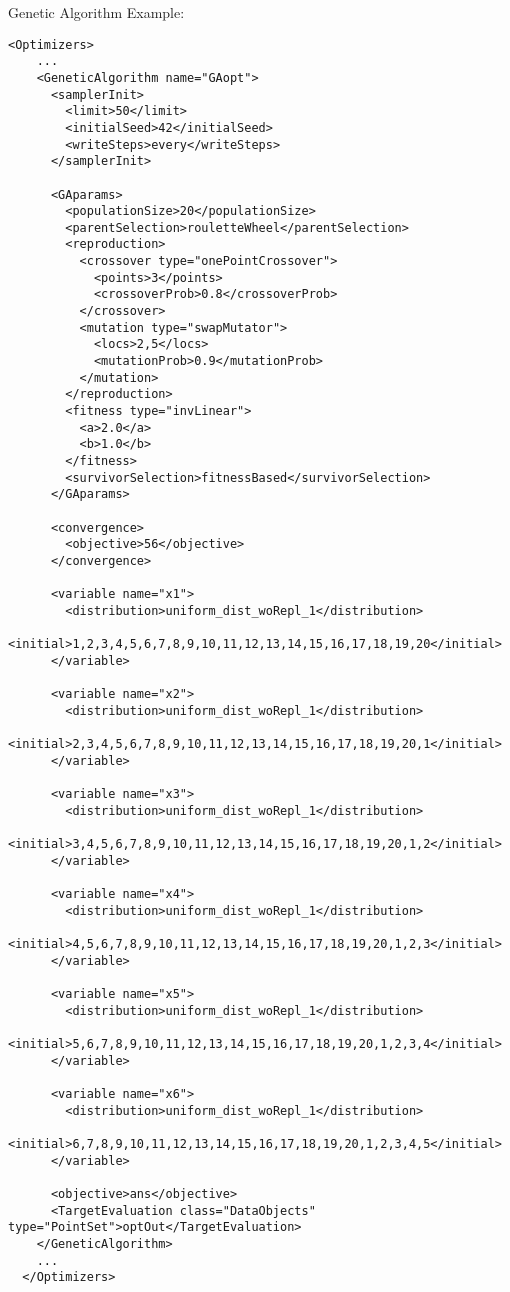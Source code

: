 \hspace{24pt}
Genetic Algorithm Example:
\begin{lstlisting}[style=XML]
  <Optimizers>
    ...
    <GeneticAlgorithm name="GAopt">
      <samplerInit>
        <limit>50</limit>
        <initialSeed>42</initialSeed>
        <writeSteps>every</writeSteps>
      </samplerInit>

      <GAparams>
        <populationSize>20</populationSize>
        <parentSelection>rouletteWheel</parentSelection>
        <reproduction>
          <crossover type="onePointCrossover">
            <points>3</points>
            <crossoverProb>0.8</crossoverProb>
          </crossover>
          <mutation type="swapMutator">
            <locs>2,5</locs>
            <mutationProb>0.9</mutationProb>
          </mutation>
        </reproduction>
        <fitness type="invLinear">
          <a>2.0</a>
          <b>1.0</b>
        </fitness>
        <survivorSelection>fitnessBased</survivorSelection>
      </GAparams>

      <convergence>
        <objective>56</objective>
      </convergence>

      <variable name="x1">
        <distribution>uniform_dist_woRepl_1</distribution>
        <initial>1,2,3,4,5,6,7,8,9,10,11,12,13,14,15,16,17,18,19,20</initial>
      </variable>

      <variable name="x2">
        <distribution>uniform_dist_woRepl_1</distribution>
        <initial>2,3,4,5,6,7,8,9,10,11,12,13,14,15,16,17,18,19,20,1</initial>
      </variable>

      <variable name="x3">
        <distribution>uniform_dist_woRepl_1</distribution>
        <initial>3,4,5,6,7,8,9,10,11,12,13,14,15,16,17,18,19,20,1,2</initial>
      </variable>

      <variable name="x4">
        <distribution>uniform_dist_woRepl_1</distribution>
        <initial>4,5,6,7,8,9,10,11,12,13,14,15,16,17,18,19,20,1,2,3</initial>
      </variable>

      <variable name="x5">
        <distribution>uniform_dist_woRepl_1</distribution>
        <initial>5,6,7,8,9,10,11,12,13,14,15,16,17,18,19,20,1,2,3,4</initial>
      </variable>

      <variable name="x6">
        <distribution>uniform_dist_woRepl_1</distribution>
        <initial>6,7,8,9,10,11,12,13,14,15,16,17,18,19,20,1,2,3,4,5</initial>
      </variable>

      <objective>ans</objective>
      <TargetEvaluation class="DataObjects" type="PointSet">optOut</TargetEvaluation>
    </GeneticAlgorithm>
    ...
  </Optimizers>
\end{lstlisting}



